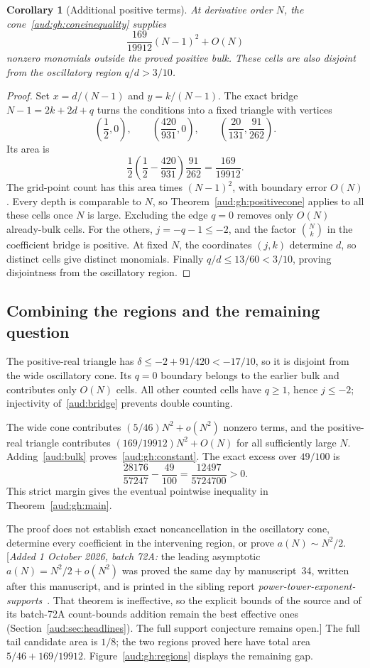 \documentclass[11pt,a4paper]{article}
\numberwithin{equation}{section}
\newtheorem{corollary}[theorem]{Corollary}
\newcommand{\addednote}[1]{{\small[\textit{Added 1 October 2026, batch 72A:} #1]}}
\begin{document}
\begin{corollary}[Additional positive terms]\label{aud:gh:positivearea}
At derivative order $N$, the cone~\eqref{aud:gh:coneinequality} supplies
\begin{equation}\label{aud:gh:trianglecount}
 \frac{169}{19912}(N-1)^2+O(N)
\end{equation}
nonzero monomials outside the proved positive bulk.  These cells are also
disjoint from the oscillatory region $q/d>3/10$.
\end{corollary}
\begin{proof}
Set $x=d/(N-1)$ and $y=k/(N-1)$.  The exact bridge
$N-1=2k+2d+q$ turns the conditions into a fixed triangle with vertices
\[
 \left(\frac12,0\right),\qquad
 \left(\frac{420}{931},0\right),\qquad
 \left(\frac{20}{131},\frac{91}{262}\right).
\]
Its area is
\[
 \frac12\left(\frac12-\frac{420}{931}\right)\frac{91}{262}
 =\frac{169}{19912}.
\]
The grid-point count has this area times $(N-1)^2$, with boundary error
$O(N)$.  Every depth is comparable to $N$, so Theorem~\ref{aud:gh:positivecone}
applies to all these cells once $N$ is large.  Excluding the edge $q=0$
removes only $O(N)$ already-bulk cells.  For the others, $j=-q-1\le-2$,
and the factor $\binom Nk$ in the coefficient bridge is positive.  At fixed
$N$, the coordinates $(j,k)$ determine $d$, so distinct cells give distinct
monomials.  Finally $q/d\le13/60<3/10$, proving disjointness from the
oscillatory region.
\end{proof}

\subsection{Combining the regions and the remaining question}
The positive-real triangle has $\delta\le-2+91/420<-17/10$, so it is disjoint from the wide oscillatory cone. Its $q=0$ boundary belongs to the earlier bulk and contributes only $O(N)$ cells. All other counted cells have $q\ge1$, hence $j\le-2$; injectivity of~\eqref{aud:bridge} prevents double counting.

The wide cone contributes $(5/46)N^2+o(N^2)$ nonzero terms, and the positive-real triangle contributes $(169/19912)N^2+O(N)$ for all sufficiently large $N$. Adding~\eqref{aud:bulk} proves~\eqref{aud:gh:constant}. The exact excess over $49/100$ is
\[
 \frac{28176}{57247}-\frac{49}{100}=\frac{12497}{5724700}>0.
\]
This strict margin gives the eventual pointwise inequality in Theorem~\ref{aud:gh:main}.

The proof does not establish exact noncancellation in the oscillatory cone, determine every coefficient in the intervening region, or prove $a(N)\sim N^2/2$. \addednote{the leading asymptotic $a(N)=N^2/2+o(N^2)$ was proved the same day by manuscript~34, written after this manuscript, and is printed in the sibling report \emph{power-tower-exponent-supports}~\cite{pte}. That theorem is ineffective, so the explicit bounds of the source and of its batch-72A count-bounds addition remain the best effective ones (Section~\ref{aud:sec:headlines}). The full support conjecture remains open.} The full tail candidate area is $1/8$; the two regions proved here have total area $5/46+169/19912$. Figure~\ref{aud:gh:regions} displays the remaining gap.
\end{document}
